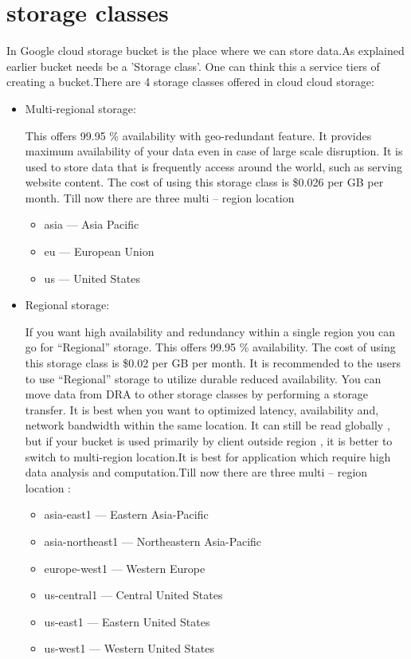 \documentclass[9pt,twocolumn,twoside]{styles/osajnl}
\begin{document}
\section{storage classes}

In Google cloud storage bucket is the place where we can store data.As explained earlier bucket needs be a 'Storage class'. One can think this a service tiers of creating a bucket.There are 4 storage classes offered in cloud cloud storage:

\begin{itemize}

\item Multi-regional storage:

This offers 99.95 \% availability with geo-redundant feature. It provides maximum availability of your data even in case of large scale disruption. It is used to store data that is frequently access around the world, such as serving website content. The cost of using this storage class is \$0.026 per GB per month. Till now there are three multi – region location 
		\begin{itemize}

			\item asia — Asia Pacific
			\item eu — European Union
			\item us — United States

		\end{itemize}
		
\item Regional storage:

If you want high availability and redundancy within a single region you can go for “Regional”  storage. This offers 99.95 \% availability. The cost of using this storage class is \$0.02 per GB per month. It is recommended to the users to use “Regional”  storage to utilize durable  reduced  availability. You can move data from DRA to other storage classes by performing a storage transfer. It is best when you want to optimized latency, availability and, network bandwidth within the same location. It can still be read globally , but if your bucket is used primarily by client outside region , it is better to switch to multi-region location.It is best for application which require high data analysis and computation.Till now there are three multi – region location :

		\begin{itemize}

			\item asia-east1 — Eastern Asia-Pacific
			\item asia-northeast1 — Northeastern Asia-Pacific
			\item europe-west1 — Western Europe
			\item us-central1 — Central United States
			\item us-east1 — Eastern United States
			\item us-west1 — Western United States


\end{itemize}
\end{itemize}
\end{document}
